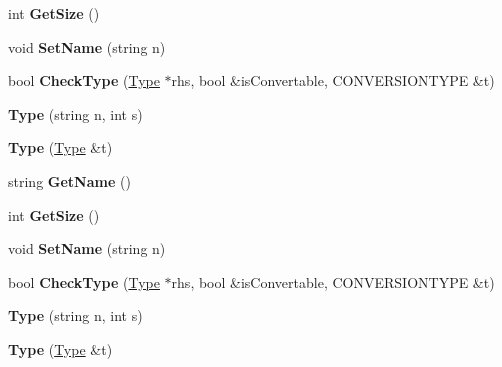 \begin{DoxyCompactItemize}
\item 
\hypertarget{classType_afe0fca035825759785b525d2a24f69fe}{int {\bfseries Get\-Size} ()}\label{classType_afe0fca035825759785b525d2a24f69fe}

\item 
\hypertarget{classType_ab8d2328a3a76289edf42b9bf0d4f278f}{void {\bfseries Set\-Name} (string n)}\label{classType_ab8d2328a3a76289edf42b9bf0d4f278f}

\item 
\hypertarget{classType_a2574b17ddc03d5ca13309811d06f1a56}{bool {\bfseries Check\-Type} (\hyperlink{classType}{Type} $\ast$rhs, bool \&is\-Convertable, C\-O\-N\-V\-E\-R\-S\-I\-O\-N\-T\-Y\-P\-E \&t)}\label{classType_a2574b17ddc03d5ca13309811d06f1a56}

\item 
\hypertarget{classType_a0ec88e19865012d53e20b97677218783}{{\bfseries Type} (string n, int s)}\label{classType_a0ec88e19865012d53e20b97677218783}

\item 
\hypertarget{classType_a617481e51492ea14507c83d5dba2cce5}{{\bfseries Type} (\hyperlink{classType}{Type} \&t)}\label{classType_a617481e51492ea14507c83d5dba2cce5}

\item 
\hypertarget{classType_a8143fe4686ae1a5709a5955396c6ee26}{string {\bfseries Get\-Name} ()}\label{classType_a8143fe4686ae1a5709a5955396c6ee26}

\item 
\hypertarget{classType_afe0fca035825759785b525d2a24f69fe}{int {\bfseries Get\-Size} ()}\label{classType_afe0fca035825759785b525d2a24f69fe}

\item 
\hypertarget{classType_ab8d2328a3a76289edf42b9bf0d4f278f}{void {\bfseries Set\-Name} (string n)}\label{classType_ab8d2328a3a76289edf42b9bf0d4f278f}

\item 
\hypertarget{classType_a2574b17ddc03d5ca13309811d06f1a56}{bool {\bfseries Check\-Type} (\hyperlink{classType}{Type} $\ast$rhs, bool \&is\-Convertable, C\-O\-N\-V\-E\-R\-S\-I\-O\-N\-T\-Y\-P\-E \&t)}\label{classType_a2574b17ddc03d5ca13309811d06f1a56}

\item 
\hypertarget{classType_a0ec88e19865012d53e20b97677218783}{{\bfseries Type} (string n, int s)}\label{classType_a0ec88e19865012d53e20b97677218783}

\item 
\hypertarget{classType_a617481e51492ea14507c83d5dba2cce5}{{\bfseries Type} (\hyperlink{classType}{Type} \&t)}\label{classType_a617481e51492ea14507c83d5dba2cce5}


\end{DoxyCompactItemize}
